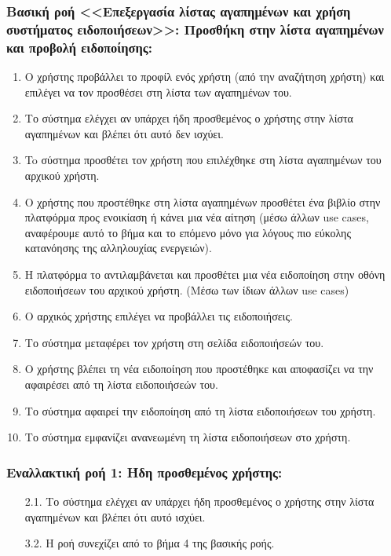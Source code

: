 \documentclass[12pt,a4paper]{article}
\begin{document}
\subsubsection*{Βασική ροή <<Επεξεργασία λίστας αγαπημένων και χρήση συστήματος ειδοποιήσεων>>: Προσθήκη στην λίστα αγαπημένων και προβολή ειδοποίησης:}
\begin{enumerate}
    \item Ο χρήστης προβάλλει το προφίλ ενός χρήστη (από την αναζήτηση χρήστη) και επιλέγει να τον προσθέσει στη λίστα των αγαπημένων του.
    \item Το σύστημα ελέγχει αν υπάρχει ήδη προσθεμένος ο χρήστης στην λίστα αγαπημένων και βλέπει ότι αυτό δεν ισχύει.
    \item To σύστημα προσθέτει τον χρήστη που επιλέχθηκε στη λίστα αγαπημένων του αρχικού χρήστη.
    \item Ο χρήστης που προστέθηκε στη λίστα αγαπημένων προσθέτει ένα βιβλίο στην πλατφόρμα προς ενοικίαση ή κάνει μια νέα αίτηση (μέσω άλλων use cases, αναφέρουμε αυτό το βήμα και το επόμενο μόνο για λόγους πιο εύκολης κατανόησης της αλληλουχίας ενεργειών).
    \item Η πλατφόρμα το αντιλαμβάνεται και προσθέτει μια νέα ειδοποίηση στην οθόνη ειδοποιήσεων του αρχικού χρήστη. (Μέσω των ίδιων άλλων use cases)
    \item Ο αρχικός χρήστης επιλέγει να προβάλλει τις ειδοποιήσεις.
    \item Το σύστημα μεταφέρει τον χρήστη στη σελίδα ειδοποιήσεών του.
    \item Ο χρήστης βλέπει τη νέα ειδοποίηση που προστέθηκε και αποφασίζει να την αφαιρέσει από τη λίστα ειδοποιήσεών του.
    \item Το σύστημα αφαιρεί την ειδοποίηση από τη λίστα ειδοποιήσεων του χρήστη.
    \item Το σύστημα εμφανίζει ανανεωμένη τη λίστα ειδοποιήσεων στο χρήστη.
\end{enumerate}

\subsubsection*{Εναλλακτική ροή 1: Ήδη προσθεμένος χρήστης:}
\begin{enumerate}
    \item [2.1.] Το σύστημα ελέγχει αν υπάρχει ήδη προσθεμένος ο χρήστης στην λίστα αγαπημένων και βλέπει ότι αυτό ισχύει.
    \item [3.2.] Η ροή συνεχίζει από το βήμα 4 της βασικής ροής.
\end{enumerate}
\end{document}
